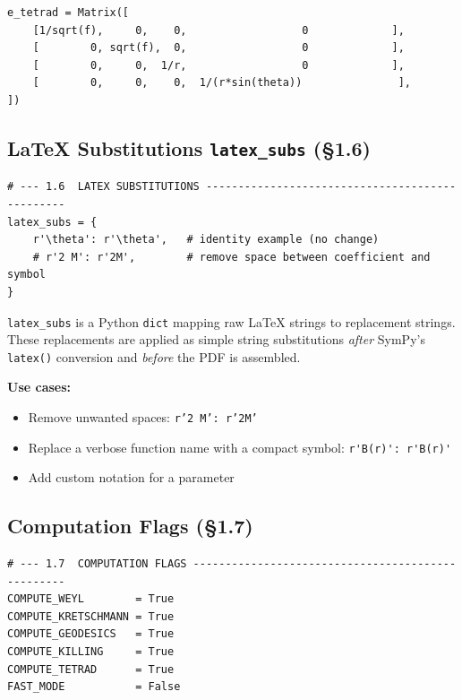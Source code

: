 \documentclass[11pt,a4paper]{article}
\newcommand{\code}[1]{\texttt{\small#1}}
\begin{document}
\begin{lstlisting}
e_tetrad = Matrix([
    [1/sqrt(f),     0,    0,                  0             ],
    [        0, sqrt(f),  0,                  0             ],
    [        0,     0,  1/r,                  0             ],
    [        0,     0,    0,  1/(r*sin(theta))               ],
])
\end{lstlisting}

\subsection{LaTeX Substitutions \code{latex\_subs} (\S1.6)}
\label{sec:cfg-latex}

\begin{lstlisting}
# --- 1.6  LATEX SUBSTITUTIONS ------------------------------------------------
latex_subs = {
    r'\theta': r'\theta',   # identity example (no change)
    # r'2 M': r'2M',        # remove space between coefficient and symbol
}
\end{lstlisting}

\code{latex\_subs} is a Python \code{dict} mapping raw LaTeX strings to
replacement strings.  These replacements are applied as simple string
substitutions \emph{after} SymPy's \code{latex()} conversion and
\emph{before} the PDF is assembled.

\textbf{Use cases:}
\begin{itemize}
  \item Remove unwanted spaces: \code{r'2 M': r'2M'}
  \item Replace a verbose function name with a compact symbol:
        \lstinline[language={}]{r'B(r)': r'B(r)'}
  \item Add custom notation for a parameter
\end{itemize}

\subsection{Computation Flags (\S1.7)}
\label{sec:cfg-flags}

\begin{lstlisting}
# --- 1.7  COMPUTATION FLAGS --------------------------------------------------
COMPUTE_WEYL        = True
COMPUTE_KRETSCHMANN = True
COMPUTE_GEODESICS   = True
COMPUTE_KILLING     = True
COMPUTE_TETRAD      = True
FAST_MODE           = False
\end{lstlisting}
\end{document}
